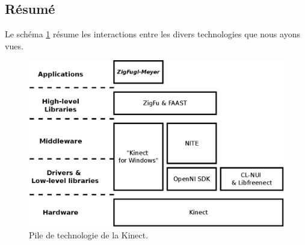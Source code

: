 
\subsection{Résumé}
Le schéma \ref{fig:technology_overview} résume les interactions entre les divers 
technologies que nous ayons vues.

\begin{figure}[h!]
\centering
\includegraphics[width=0.9\linewidth]{images/technology_overview}
\caption{Pile de technologie de la Kinect.}
\label{fig:technology_overview}
\end{figure}